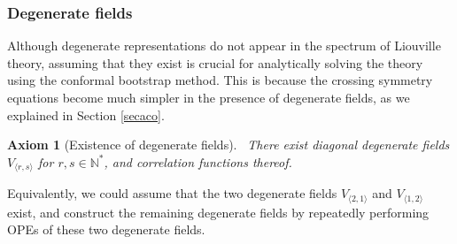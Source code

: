\documentclass[12pt, a4paper, notitlepage, twoside]{report}
\numberwithin{equation}{section}
\theoremstyle{break}
\newtheorem{hyp}{Axiom}[chapter]
\begin{document}
\subsubsection{Degenerate fields}

Although degenerate representations do not appear in the spectrum of Liouville theory, assuming  that they exist is crucial for analytically solving the theory using the conformal bootstrap method. This is because the crossing symmetry equations become much simpler in the presence of degenerate fields, as we explained in Section \ref{secaco}.

\begin{hyp}[Existence of degenerate fields]
 ~\label{ax:edf}
There exist diagonal degenerate fields $V_{\langle r,s \rangle}$ for $r,s\in\mathbb{N}^*$, and correlation functions thereof.
\end{hyp}
\noindent
Equivalently, we could assume that the two degenerate fields $V_{\langle 2,1\rangle}$ and $V_{\langle 1,2\rangle}$ exist, and construct the remaining degenerate fields by repeatedly performing OPEs of these two degenerate fields.
\end{document}
